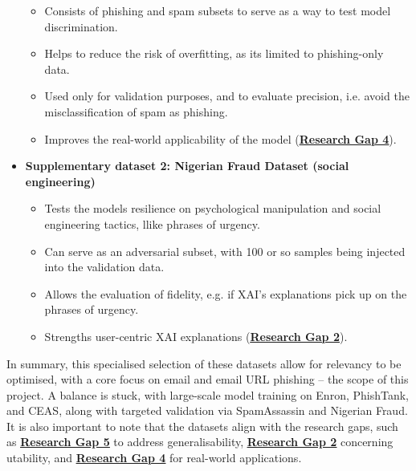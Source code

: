 \begin{itemize}
  \begin{itemize}
    \item Consists of phishing and spam subsets to serve as a way to test model discrimination.
    \item Helps to reduce the risk of overfitting, as its limited to phishing-only data.
    \item Used only for validation purposes, and to evaluate precision, i.e. avoid the misclassification of spam as phishing.
    \item Improves the real-world applicability of the model (\hyperref[research-gap-4]{\uline{\textbf{Research Gap 4}}}).
  \end{itemize}
  \item \textbf{Supplementary dataset 2: Nigerian Fraud Dataset (social engineering)}
  \begin{itemize}
    \item Tests the models resilience on psychological manipulation and social engineering tactics, llike phrases of urgency.
    \item Can serve as an adversarial subset, with 100 or so samples being injected into the validation data.
    \item Allows the evaluation of fidelity, e.g. if XAI's explanations pick up on the phrases of urgency.
    \item Strengths user-centric XAI explanations (\hyperref[research-gap-2]{\uline{\textbf{Research Gap 2}}}).
  \end{itemize}
\end{itemize}

\noindent In summary, this specialised selection of these datasets allow for relevancy to be optimised, with a core focus on email and email URL phishing -- the scope of this project. A balance is stuck, with large-scale model training on Enron, PhishTank, and CEAS, along with targeted validation via SpamAssassin and Nigerian Fraud. It is also important to note that the datasets align with the research gaps, such as \hyperref[research-gap-5]{\uline{\textbf{Research Gap 5}}} to address generalisability, \hyperref[research-gap-2]{\uline{\textbf{Research Gap 2}}} concerning utability, and \hyperref[research-gap-4]{\uline{\textbf{Research Gap 4}}} for real-world applications.

